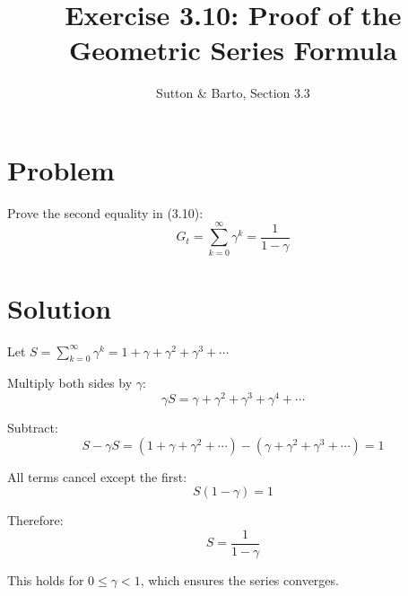 \documentclass[11pt]{article}
\title{Exercise 3.10: Proof of the Geometric Series Formula}
\author{Sutton \& Barto, Section 3.3}
\date{}
\begin{document}
\maketitle

\section*{Problem}

Prove the second equality in (3.10):
\[
    G_t = \sum_{k=0}^{\infty} \gamma^k = \frac{1}{1 - \gamma}
\]

\section*{Solution}

Let $S = \sum_{k=0}^{\infty} \gamma^k = 1 + \gamma + \gamma^2 + \gamma^3 + \cdots$

Multiply both sides by $\gamma$:
\[
    \gamma S = \gamma + \gamma^2 + \gamma^3 + \gamma^4 + \cdots
\]

Subtract:
\[
    S - \gamma S = (1 + \gamma + \gamma^2 + \cdots) - (\gamma + \gamma^2 + \gamma^3 + \cdots) = 1
\]

All terms cancel except the first:
\[
    S(1 - \gamma) = 1
\]

Therefore:
\[
    \boxed{S = \frac{1}{1 - \gamma}}
\]

This holds for $0 \le \gamma < 1$, which ensures the series converges.
\end{document}
